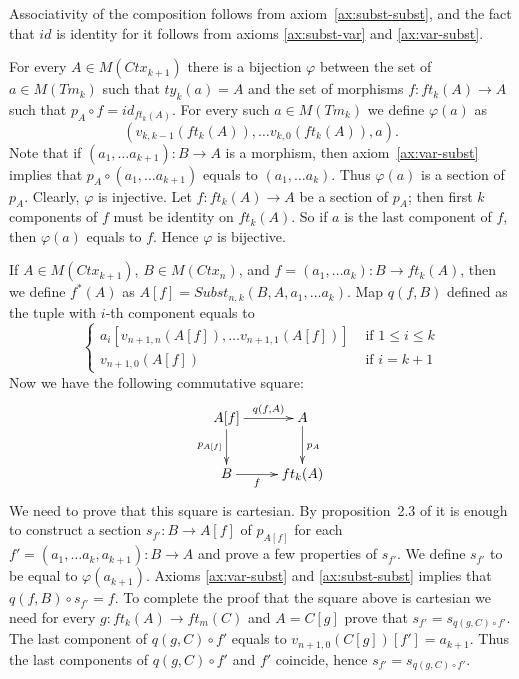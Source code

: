 \documentclass[reqno]{amsart}
\theoremstyle{definition}
\theoremstyle{remark}
\numberwithin{figure}{section}
\begin{document}
Associativity of the composition follows from axiom~\eqref{ax:subst-subst}, and the fact that $id$ is identity for it follows from axioms \eqref{ax:subst-var} and \eqref{ax:var-subst}.

For every $A \in M(Ctx_{k+1})$ there is a bijection $\varphi$ between the set of $a \in M(Tm_k)$ such that $ty_k(a) = A$ and the set of morphisms $f : ft_k(A) \to A$ such that $p_A \circ f = id_{ft_k(A)}$.
For every such $a \in M(Tm_k)$ we define $\varphi(a)$ as
\[ (v_{k,k-1}(ft_k(A)), \ldots v_{k,0}(ft_k(A)), a). \]
Note that if $(a_1, \ldots a_{k+1}) : B \to A$ is a morphism, then axiom~\eqref{ax:var-subst} implies that $p_A \circ (a_1, \ldots a_{k+1})$ equals to $(a_1, \ldots a_k)$.
Thus $\varphi(a)$ is a section of $p_A$.
Clearly, $\varphi$ is injective.
Let $f : ft_k(A) \to A$ be a section of $p_A$; then first $k$ components of $f$ must be identity on $ft_k(A)$.
So if $a$ is the last component of $f$, then $\varphi(a)$ equals to $f$.
Hence $\varphi$ is bijective.

If $A \in M(Ctx_{k+1})$, $B \in M(Ctx_n)$, and $f = (a_1, \ldots a_k) : B \to ft_k(A)$, then we define $f^*(A)$ as $A[f] = Subst_{n,k}(B, A, a_1, \ldots a_k)$.
Map $q(f,B)$ defined as the tuple with $i$-th component equals to
\[ \left\{
  \begin{array}{lr}
    a_i[v_{n+1,n}(A[f]), \ldots v_{n+1,1}(A[f])] & \text{ if } 1 \leq i \leq k \\
    v_{n+1,0}(A[f])                              & \text{ if } i = k+1
  \end{array}
\right. \]
Now we have the following commutative square:
\[ \xymatrix{ A[f] \ar[r]^-{q(f,A)} \ar[d]_{p_{A[f]}} & A \ar[d]^{p_A} \\
              B \ar[r]_-f                             & ft_k(A)
            } \]
We need to prove that this square is cartesian.
By proposition~2.3 of \cite{c-systems} it is enough to construct a section $s_{f'} : B \to A[f]$ of $p_{A[f]}$ for each $f' = (a_1, \ldots a_k, a_{k+1}) : B \to A$ and prove a few properties of $s_{f'}$.
We define $s_{f'}$ to be equal to $\varphi(a_{k+1})$.
Axioms \eqref{ax:var-subst} and \eqref{ax:subst-subst} implies that $q(f, B) \circ s_{f'} = f$.
To complete the proof that the square above is cartesian we need for every $g : ft_k(A) \to ft_m(C)$ and $A = C[g]$ prove that $s_{f'} = s_{q(g,C) \circ f'}$.
The last component of $q(g,C) \circ f'$ equals to $v_{n+1,0}(C[g])[f'] = a_{k+1}$.
Thus the last components of $q(g,C) \circ f'$ and $f'$ coincide, hence $s_{f'} = s_{q(g,C) \circ f'}$.
\end{document}
